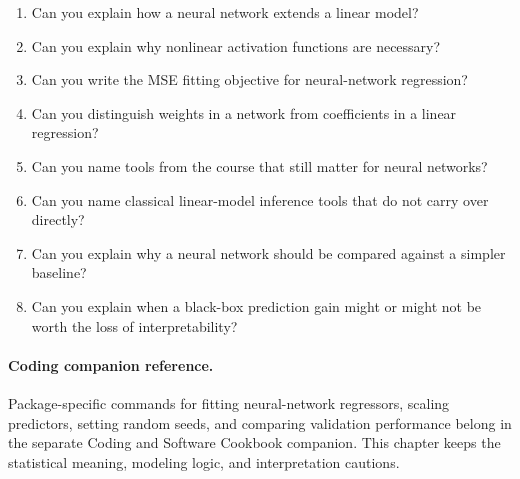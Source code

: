 \begin{enumerate}
  \item Can you explain how a neural network extends a linear model?
  \item Can you explain why nonlinear activation functions are necessary?
  \item Can you write the MSE fitting objective for neural-network regression?
  \item Can you distinguish weights in a network from coefficients in a linear regression?
  \item Can you name tools from the course that still matter for neural networks?
  \item Can you name classical linear-model inference tools that do not carry over directly?
  \item Can you explain why a neural network should be compared against a simpler baseline?
  \item Can you explain when a black-box prediction gain might or might not be worth the loss of interpretability?
\end{enumerate}

\paragraph{Coding companion reference.}
Package-specific commands for fitting neural-network regressors, scaling predictors, setting random seeds, and comparing validation performance belong in the separate Coding and Software Cookbook companion.  This chapter keeps the statistical meaning, modeling logic, and interpretation cautions.
